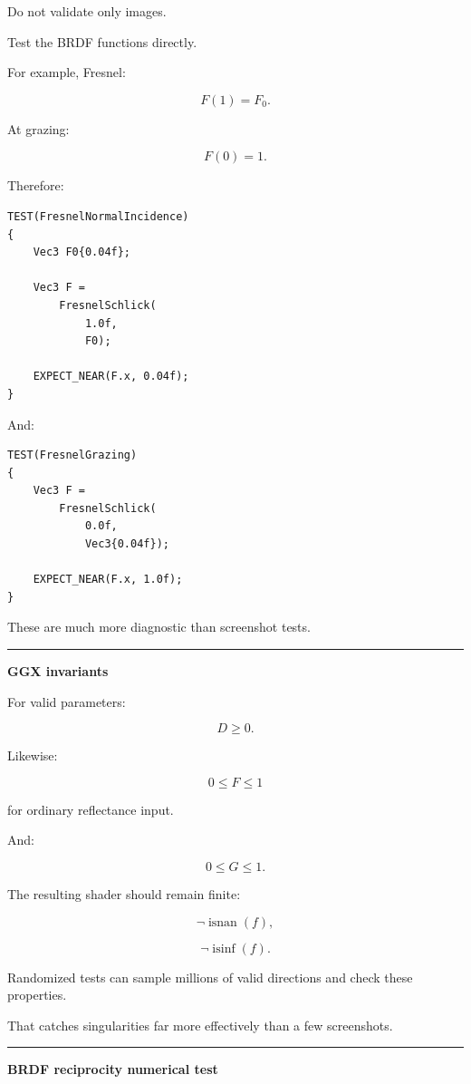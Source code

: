 Do not validate only images.

Test the BRDF functions directly.

For example, Fresnel:

\[
F(1)=F_0.
\]

At grazing:

\[
F(0)=1.
\]

Therefore:

\begin{verbatim}
TEST(FresnelNormalIncidence)
{
    Vec3 F0{0.04f};

    Vec3 F =
        FresnelSchlick(
            1.0f,
            F0);

    EXPECT_NEAR(F.x, 0.04f);
}
\end{verbatim}

And:

\begin{verbatim}
TEST(FresnelGrazing)
{
    Vec3 F =
        FresnelSchlick(
            0.0f,
            Vec3{0.04f});

    EXPECT_NEAR(F.x, 1.0f);
}
\end{verbatim}

These are much more diagnostic than screenshot tests.

\begin{center}\rule{0.5\linewidth}{0.5pt}\end{center}

\textbf{GGX invariants}

For valid parameters:

\[
D\ge0.
\]

Likewise:

\[
0\le F\le1
\]

for ordinary reflectance input.

And:

\[
0\le G\le1.
\]

The resulting shader should remain finite:

\[
\neg\operatorname{isnan}(f),
\]

\[
\neg\operatorname{isinf}(f).
\]

Randomized tests can sample millions of valid directions and check these properties.

That catches singularities far more effectively than a few screenshots.

\begin{center}\rule{0.5\linewidth}{0.5pt}\end{center}

\textbf{BRDF reciprocity numerical test}

